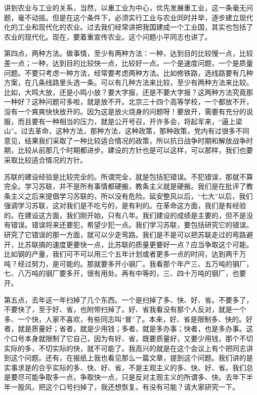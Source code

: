 讲到农业与工业的关系，当然，以重工业为中心，优先发展重工业，这一条毫无问题，毫不动摇。但是在这个条件下，必须实行工业与农业同时并举，逐步建立现代化的工业和现代化的农业。过去我们经常讲把我国建成一个工业国，其实也包括了农业的现代化。现在，要着重宣传农业。这个问题小平同志也讲了。

第四点，两种方法。做事情，至少有两种方法：一种，达到目的比较慢一点，比较差一点；一种，达到目的比较快一点，比较好一点。一个是速度问题，一个是质量问题。不要只考虑一种方法，经常要考虑两种方法。比如修铁路，选线路要有几种方案，在几条线路里头选一条。可以有几种方法来比较，至少有两种方法来比较。比如，大鸣大放，还是小鸣小放？要大字报，还是不要大字报？这两种方法究竟那一种好？这种问题可多啦，就是放不开。北京三十四个高等学校，一个都放不开，没有一个爽爽快快放开的。因为这是放火烧身的问题呀！要放开，需要有充分的说服，而且要有一种相当的压力，就是公开号召，开许多会，将起军来，“逼上梁山”。过去革命，这种方法，那种方法，这种政策，那种政策，党内有过很多不同意见，结果我们采取了一种比较适合情况的政策，所以抗日战争时期和解放战争时期，比较从前那几个时期都进步。建设的方针也是可以这样，可以那样，我们也要采取比较适合情况的方针。

苏联的建设经验是比较完全的。所谓完全，就是包括犯错误。不犯错误，那就不算完全。学习苏联，并不是所有事情都硬搬，教条主义就是硬搬。我们是在批评了教条主义之后来提倡学习苏联的，所以没有危险。延安整风以后，“七大”以后，我们强调学习苏联，这对我们是不吃亏的，是有利的。在革命这方面，我们是有经验的。在建设这方面，我们刚开始，只有八年。我们建设的成绩是主要的，但不是没有错误。错误将来还要犯，希望少犯一点。我们学习苏联，要包括研究它的错误。研究了它错误的那一方面，就可以少走弯路。我们是不是可以把苏联走过的弯路避开，比苏联搞的速度更要快一点，比苏联的质量更要好一点？应当争取这个可能。比如钢的产量，我们可不可以用三个五年计划或者更多一点的时间，达到两千万吨？经过努力，是可能的。那就要多开小钢厂。我看那个年产三、五万吨的钢厂，七、八万吨的钢厂要多开，很有用处。再有中等的，三、四十万吨的钢厂，也要开。

第五点，去年这一年扫掉了几个东西。一个是扫掉了多、快、好、省。不要多了，不要快了，至于好、省，也附带扫掉了。好、省我看没有那个人反对，就是一个多、一个快，人家不喜欢，有些同志叫“冒”了。本来，好、省是限制多、快的。好者，就是质量好；省者，就是少用钱；多者，就是多办事；快者，也是多办事。这个口号本身就限制了它自己，因为有好、省，既要质量好，又要少用钱，那个不切实际的多，不切实际的快，就不可能了。我高兴的就是在这个会议上有个把同志讲到这个问题。还有，在报纸上我也看见那么一篇文章，提到这个问题。我们讲的是实事求是的合乎实际的多、快、好、省，不是主观主义的多、快、好、省。我们总是要尽可能争取多一点，争取快一点，只是反对主观主义的所谓多、快。去年下半年一股风，把这个口号扫掉了，我还想恢复。有没有可能？请大家研究一下。


